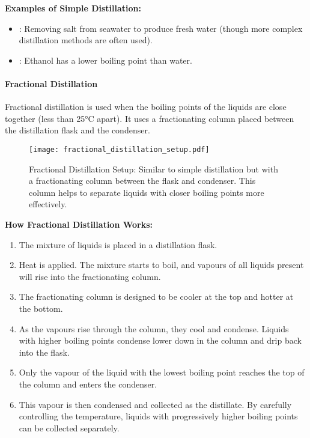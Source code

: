 \begin{example}
\textbf{Examples of Simple Distillation:}
\begin{itemize}
    \item {}: Removing salt from seawater to produce fresh water (though more complex distillation methods are often used).
    \item {}: Ethanol has a lower boiling point than water.
\end{itemize}
\end{example}

\paragraph{Fractional Distillation}

Fractional distillation is used when the boiling points of the liquids are close together (less than 25°C apart). It uses a fractionating column placed between the distillation flask and the condenser.

\begin{figure}
\centering
\texttt{[image: fractional\_distillation\_setup.pdf]}
\caption{Fractional Distillation Setup: Similar to simple distillation but with a fractionating column between the flask and condenser. This column helps to separate liquids with closer boiling points more effectively.}
\end{figure}

\textbf{How Fractional Distillation Works:}
\begin{enumerate}
    \item The mixture of liquids is placed in a distillation flask.
    \item Heat is applied. The mixture starts to boil, and vapours of all liquids present will rise into the fractionating column.
    \item The fractionating column is designed to be cooler at the top and hotter at the bottom.
    \item As the vapours rise through the column, they cool and condense. Liquids with higher boiling points condense lower down in the column and drip back into the flask.
    \item Only the vapour of the liquid with the lowest boiling point reaches the top of the column and enters the condenser.
    \item This vapour is then condensed and collected as the distillate. By carefully controlling the temperature, liquids with progressively higher boiling points can be collected separately.
\end{enumerate}

